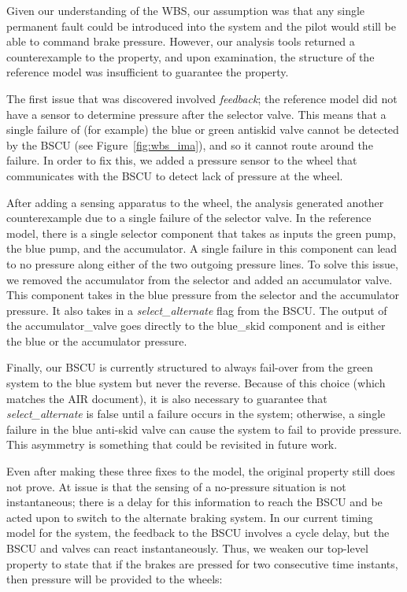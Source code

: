 Given our understanding of the WBS, our assumption was that any single permanent fault could be introduced into the system and the pilot would still be able to command brake pressure.  However, our analysis tools returned a counterexample to the property, and upon examination, the structure of the reference model was insufficient to guarantee the property.  

The first issue that was discovered involved {\em feedback}; the reference model did not have a sensor to determine pressure after the selector valve.  This means that a single failure of (for example) the blue or green antiskid valve cannot be detected by the BSCU (see Figure~\ref{fig:wbs_ima}), and so it cannot route around the failure.  In order to fix this, we added a pressure sensor to the wheel that communicates with the BSCU to detect lack of pressure at the wheel.


After adding a sensing apparatus to the wheel, the analysis generated another counterexample due to a single failure of the selector valve.  In the reference model, there is a single selector component that takes as inputs the green pump, the blue pump, and the accumulator.  A single failure in this component can lead to no pressure along either of the two outgoing pressure lines.
To solve this issue, we removed the accumulator from the selector and added an accumulator valve.   This component takes in the blue pressure from the selector and the accumulator pressure. It also takes in a \textit{select\_alternate} flag from the BSCU. The output of the accumulator\_valve goes directly to the blue\_skid component and is either the blue or the accumulator pressure.

Finally, our BSCU is currently structured to always fail-over from the green system to the blue system but never the reverse.  Because of this choice (which matches the AIR document), it is also necessary to guarantee that \textit{select\_alternate} is false until a failure occurs in the system; otherwise, a single failure in the blue anti-skid valve can cause the system to fail to provide pressure.  This asymmetry is something that could be revisited in future work.


Even after making these three fixes to the model, the original property still does not prove.  At issue is that the sensing of a no-pressure situation is not instantaneous; there is a delay for this information to reach the BSCU and be acted upon to switch to the alternate braking system.  In our current timing model for the system, the feedback to the BSCU involves a cycle delay, but the BSCU and valves can react instantaneously.  Thus, we weaken our top-level property to state that if the brakes are pressed for two consecutive time instants, then pressure will be provided to the wheels:

